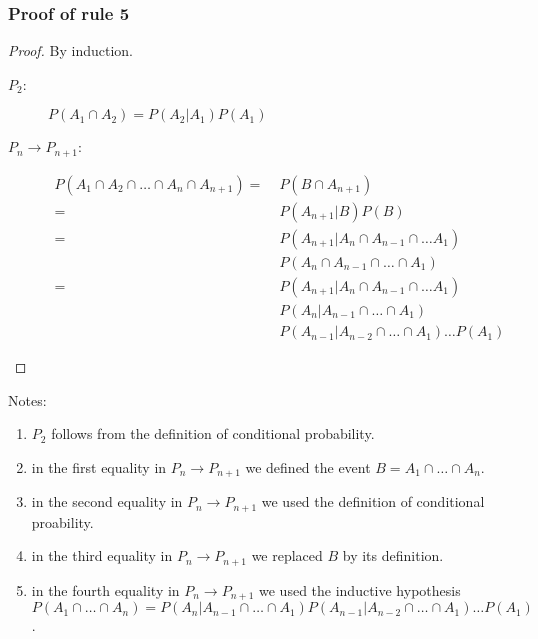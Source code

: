 \begin{frame}
    \frametitle{Proof of rule 5}

    \tiny
    \begin{proof}
        By induction.

        \begin{description}
            \item[$P_2$:] $P(A_1\cap A_2)=P(A_2|A_1)P(A_1)$
            \item[$P_n\rightarrow P_{n+1}$:]
                \begin{align*}
                    P(A_1\cap A_2\cap\ldots\cap A_n\cap A_{n+1})=\;&P(B\cap A_{n+1})\\
                    =\;&P(A_{n+1}|B)P(B)\\
                    =\;&P(A_{n+1}|A_n\cap A_{n-1}\cap\ldots A_1)\\
                       &P(A_n\cap A_{n-1}\cap\ldots\cap A_1)\\
                    =\;&P(A_{n+1}|A_n\cap A_{n-1}\cap\ldots A_1)\\
                       &P(A_n|A_{n-1}\cap\ldots\cap A_1)\\
                       &P(A_{n-1}|A_{n-2}\cap\ldots\cap A_1)\ldots P(A_1)
                \end{align*}
        \end{description}
    \end{proof}
    Notes:
    \begin{enumerate}
        \item $P_2$ follows from the definition of conditional probability.
        \item in the first equality in $P_n\rightarrow P_{n+1}$ we defined the
            event $B=A_1\cap\ldots\cap A_n$.
        \item in the second equality in $P_n\rightarrow P_{n+1}$ we used the
            definition of conditional proability.
        \item in the third equality in $P_n\rightarrow P_{n+1}$ we replaced $B$
            by its definition.
        \item in the fourth equality in $P_n\rightarrow P_{n+1}$ we used the
            inductive hypothesis $P(A_1\cap\ldots\cap A_n) =
            P(A_n|A_{n-1}\cap\ldots\cap A_1)P(A_{n-1}|A_{n-2}\cap\ldots\cap
            A_1)\ldots P(A_1)$.
    \end{enumerate}
\end{frame}

\begin{comment}
\begin{frame}
    \frametitle{Example:}

    - redo Example 7.9 (solution following Rule 4)

\end{frame}

\begin{frame}
    \frametitle{Example:}

    - probability that it takes 10 or more cards before the first ace appears

\end{frame}
\end{comment}

